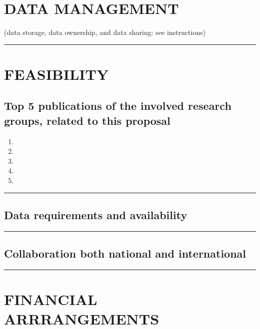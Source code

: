 \documentclass{article}
\begin{document}
\section{DATA MANAGEMENT}
 (data storage, data ownership, and data sharing: see instructions)

\begin{center}
    \rule{\textwidth}{0.5pt}
\end{center}

\section{FEASIBILITY}

\subsection{Top 5 publications of the involved research groups, related to this proposal}

\begin{enumerate}
    \item
    \item
    \item
    \item
    \item
\end{enumerate}

\begin{center}
    \rule{\textwidth}{0.5pt}
\end{center}

\subsection{Data requirements and availability}

\begin{center}
    \rule{\textwidth}{0.5pt}
\end{center}

\subsection{Collaboration both national and international}

\begin{center}
    \rule{\textwidth}{0.5pt}
\end{center}

\section{FINANCIAL ARRRANGEMENTS}
\end{document}
